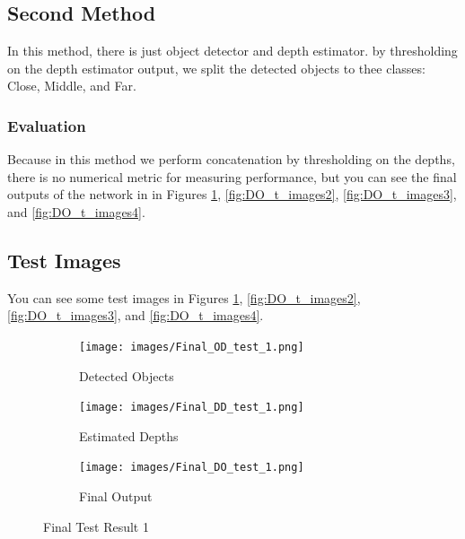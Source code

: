 \documentclass[a4paper, openany]{book}
\begin{document}
\subsection{Second Method}
	\vspace{0.3cm}

In this method, there is just object detector and depth estimator. by thresholding on the depth estimator output, we split the detected objects to thee classes: Close, Middle, and Far.

\subsubsection{Evaluation}
	\vspace{0.3cm}

Because in this method we perform concatenation by thresholding on the depths, there is no numerical metric for measuring performance, but you can see the final outputs of the network in in Figures \ref{fig:DO_t_images1}, \ref{fig:DO_t_images2}, \ref{fig:DO_t_images3}, and \ref{fig:DO_t_images4}.


\newpage

\subsection{Test Images}
	\vspace{0.3cm}
	
	
	
You can see some test images in Figures \ref{fig:DO_t_images1}, \ref{fig:DO_t_images2}, \ref{fig:DO_t_images3}, and \ref{fig:DO_t_images4}.

\begin{figure}[ht]
  \centering
    \begin{subfigure}[b]{0.45\linewidth}
    \texttt{[image: images/Final\_OD\_test\_1.png]}
    \caption{Detected Objects}
  \end{subfigure}
  \begin{subfigure}[b]{0.45\linewidth}
    \texttt{[image: images/Final\_DD\_test\_1.png]}
    \caption{Estimated Depths}
  \end{subfigure}
      \begin{subfigure}[b]{0.9\linewidth}
    \texttt{[image: images/Final\_DO\_test\_1.png]}
    \caption{Final Output}
  \end{subfigure}
  
      \caption{Final Test Result 1}
  \label{fig:DO_t_images1}
\end{figure}
\end{document}
